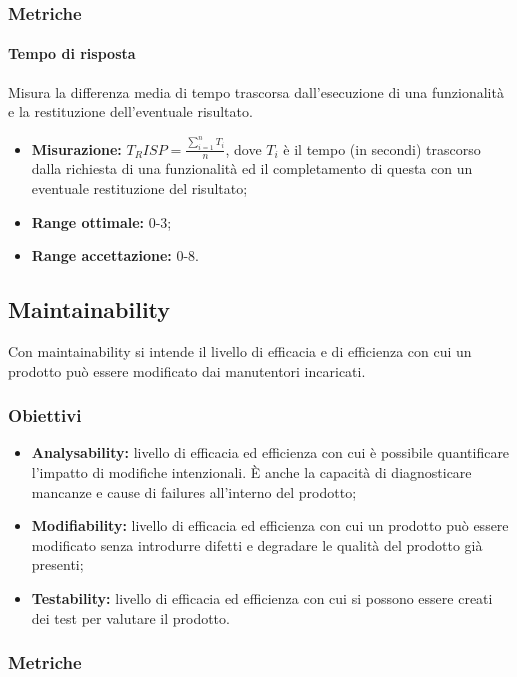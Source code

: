 		\subsubsection{Metriche}
			\paragraph{Tempo di risposta} \Spazio
			Misura la differenza media di tempo trascorsa dall’esecuzione di una funzionalità e la restituzione dell’eventuale risultato.
			\begin{itemize}
				\item {\textbf{Misurazione:} 
				$T_RISP=\frac{\sum\limits_{i=1}^n {T_i }}{n}$, dove $T_i$ è il tempo (in secondi) trascorso dalla richiesta di una funzionalità ed il completamento di questa con un eventuale restituzione del risultato};
				\item {\textbf{Range ottimale:} 0-3;}
				\item {\textbf{Range accettazione:} 0-8.}
			\end{itemize} 
			
	\subsection{Maintainability}
		Con maintainability si intende il livello di efficacia e di efficienza con cui un prodotto può essere modificato dai manutentori incaricati.
		\subsubsection{Obiettivi}
		\begin{itemize}
			\item {\textbf{Analysability:} livello di efficacia ed efficienza con cui è possibile quantificare l'impatto di modifiche intenzionali. È anche la capacità di diagnosticare mancanze e cause di failures all'interno del prodotto; }
			\item{\textbf{Modifiability:} livello di efficacia ed efficienza con cui un prodotto può essere modificato senza introdurre difetti e degradare le qualità del prodotto già presenti;}
			\item{\textbf{Testability:} livello di efficacia ed efficienza con cui si possono essere creati dei test per valutare il prodotto.}
		\end{itemize}
		\subsubsection{Metriche}
